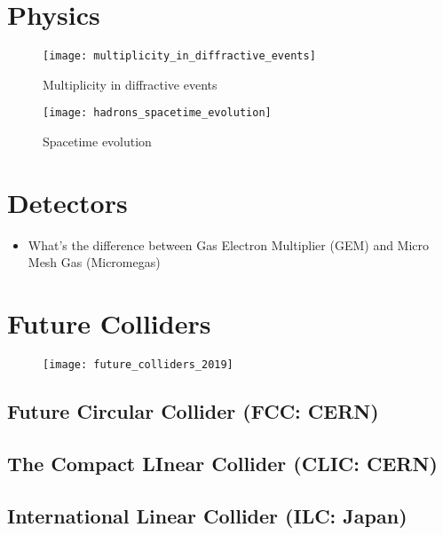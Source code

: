\section{Physics}
\begin{figure}
    \texttt{[image: multiplicity\_in\_diffractive\_events]}
    \caption{Multiplicity in diffractive events}
\end{figure}

\begin{figure}
    \texttt{[image: hadrons\_spacetime\_evolution]}
    \caption{Spacetime evolution}
\end{figure}



\section{Detectors}
\begin{itemize}
    \item What's the difference between Gas Electron Multiplier (GEM) and
	Micro Mesh Gas (Micromegas)
\end{itemize}

\section{Future Colliders}
\begin{figure}
    \texttt{[image: future\_colliders\_2019]}
\end{figure}

\subsection{Future Circular Collider (FCC: CERN)}

\subsection{The Compact LInear Collider (CLIC: CERN)}

\subsection{International Linear Collider (ILC: Japan)}

